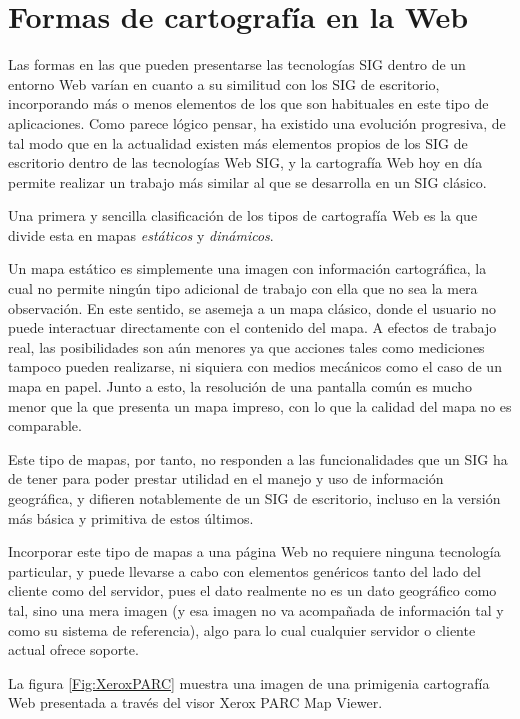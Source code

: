 \section{Formas de cartografía en la Web}

Las formas en las que pueden presentarse las tecnologías SIG dentro de un entorno Web varían en cuanto a su similitud con los SIG de escritorio, incorporando más o menos elementos de los que son habituales en este tipo de aplicaciones. Como parece lógico pensar, ha existido una evolución progresiva, de tal modo que en la actualidad existen más elementos propios de los SIG de escritorio dentro de las tecnologías Web SIG, y la cartografía Web hoy en día permite realizar un trabajo más similar al que se desarrolla en un SIG clásico.

Una primera y sencilla clasificación de los tipos de cartografía Web es la que divide esta en mapas \emph{estáticos} y \emph{dinámicos}\cite{Kraak2001Francis}. 

Un mapa estático es simplemente una imagen con información cartográfica, la cual no permite ningún tipo adicional de trabajo con ella que no sea la mera observación. En este sentido, se asemeja a un mapa clásico, donde el usuario no puede interactuar directamente con el contenido del mapa. A efectos de trabajo real, las posibilidades son aún menores ya que acciones tales como mediciones tampoco pueden realizarse, ni siquiera con medios mecánicos como el caso de un mapa en papel. Junto a esto, la resolución de una pantalla común es mucho menor que la que presenta un mapa impreso, con lo que la calidad del mapa no es comparable.

Este tipo de mapas, por tanto, no responden a las funcionalidades que un SIG ha de tener para poder prestar utilidad en el manejo y uso de información geográfica, y difieren notablemente de un SIG de escritorio, incluso en la versión más básica y primitiva de estos últimos.

Incorporar este tipo de mapas a una página Web no requiere ninguna tecnología particular, y puede llevarse a cabo con elementos genéricos tanto del lado del cliente como del servidor, pues el dato realmente no es un dato geográfico como tal, sino una mera imagen (y esa imagen no va acompañada de información tal y como su sistema de referencia), algo para lo cual cualquier servidor o cliente actual ofrece soporte.

La figura \ref{Fig:XeroxPARC} muestra una imagen de una primigenia cartografía Web presentada a través del visor Xerox PARC Map Viewer.

